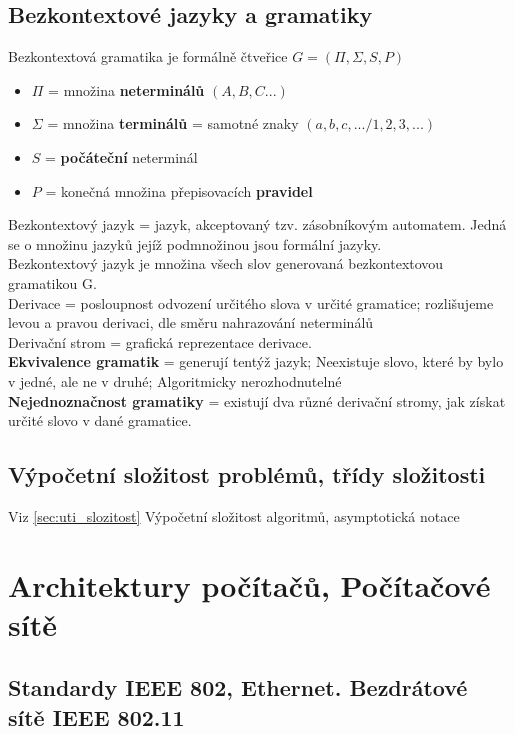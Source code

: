 \documentclass[10pt,a4paper]{article}
\begin{document}
\subsection{Bezkontextové jazyky a gramatiky}
Bezkontextová gramatika je formálně čtveřice $G = (\Pi, \Sigma, S, P)$
\begin{itemize}
\item $\Pi$ = množina \textbf{neterminálů} $(A,B,C...)$
\item $\Sigma$ = množina \textbf{terminálů} = samotné znaky $(a,b,c,.../1,2,3,...)$
\item $S$ = \textbf{počáteční} neterminál
\item $P$ = konečná množina přepisovacích \textbf{pravidel}
\end{itemize}
Bezkontextový jazyk = jazyk, akceptovaný tzv. zásobníkovým automatem. Jedná se o množinu jazyků jejíž podmnožinou jsou formální jazyky.\\
Bezkontextový jazyk je množina všech slov generovaná bezkontextovou gramatikou G.\\
Derivace = posloupnost odvození určitého slova v určité gramatice; rozlišujeme levou a pravou derivaci, dle směru nahrazování neterminálů\\
Derivační strom = grafická reprezentace derivace.\\
\textbf{Ekvivalence gramatik} = generují tentýž jazyk; Neexistuje slovo, které by bylo v jedné, ale ne v druhé; Algoritmicky nerozhodnutelné\\
\textbf{Nejednoznačnost gramatiky} = existují dva různé derivační stromy, jak získat určité slovo v dané gramatice.\\
\subsection{Výpočetní složitost problémů, třídy složitosti}
Viz \ref{sec:uti_slozitost} Výpočetní složitost algoritmů, asymptotická notace

\newpage
\section{Architektury počítačů, Počítačové sítě}
\subsection{Standardy IEEE 802, Ethernet. Bezdrátové sítě IEEE 802.11}
\end{document}
